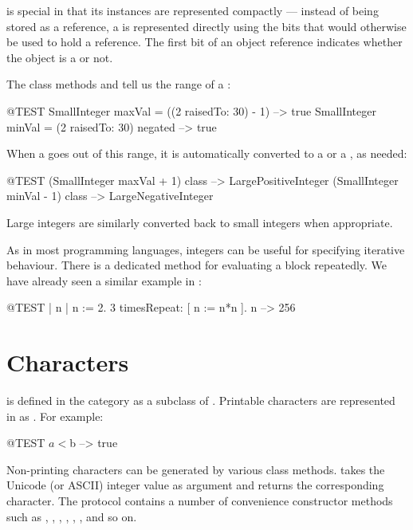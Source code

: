 \documentclass[a4paper,10pt,twoside]{book}
\begin{document}
 is special in that its instances are represented compactly --- instead of being stored as a reference, a  is represented directly using the bits that would otherwise be used to hold a reference.  The first bit of an object reference indicates whether the object is a  or not.

The class methods  and  tell us the range of a :

\begin{code}{@TEST}
SmallInteger maxVal = ((2 raisedTo: 30) - 1)      --> true
SmallInteger minVal = (2 raisedTo: 30) negated --> true
\end{code}

When a  goes out of this range, it is automatically converted to a  or a , as needed:

\begin{code}{@TEST}
(SmallInteger maxVal + 1) class --> LargePositiveInteger
(SmallInteger minVal - 1) class  --> LargeNegativeInteger
\end{code}

Large integers are similarly converted back to small integers when appropriate.

As in most programming languages, integers can be useful for specifying iterative behaviour.  There is a dedicated method  for evaluating a block repeatedly.
We have already seen a similar example in :
\begin{code}{@TEST | n |}
n := 2.
3 timesRepeat: [ n := n*n ].
n --> 256
\end{code}

\section{Characters}

 is defined in the  category as a subclass of . Printable characters are represented in \pharo as .  For example:

\begin{code}{@TEST}
$a < $b --> true
\end{code}

Non-printing characters can be generated by various class methods.  \mbox{} takes the Unicode (or ASCII) integer value as argument and returns the corresponding character. The protocol  contains a number of convenience constructor methods such as , , , , , , and so on.
\end{document}
